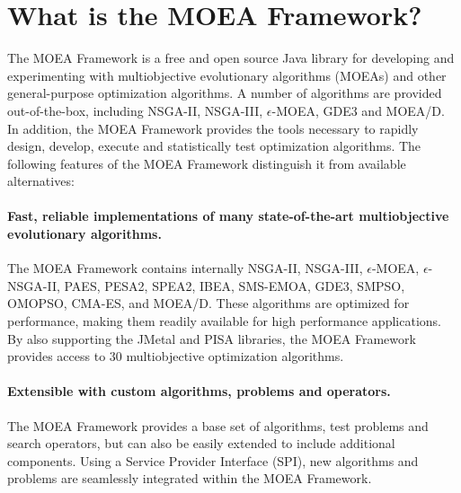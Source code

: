 %
%

\section{What is the MOEA Framework?}

The MOEA Framework is a free and open source Java library for developing and experimenting with multiobjective evolutionary algorithms (MOEAs) and other general-purpose optimization algorithms.  A number of algorithms are provided out-of-the-box, including NSGA-II, NSGA-III, $\epsilon$-MOEA, GDE3 and MOEA/D.  In addition, the MOEA Framework provides the tools necessary to rapidly design, develop, execute and statistically test optimization algorithms.  The following features of the MOEA Framework distinguish it from available alternatives:

\paragraph{Fast, reliable implementations of many state-of-the-art multiobjective evolutionary algorithms.}  The MOEA Framework contains internally NSGA-II, NSGA-III, $\epsilon$-MOEA, $\epsilon$-NSGA-II, PAES, PESA2, SPEA2, IBEA, SMS-EMOA, GDE3, SMPSO, OMOPSO, CMA-ES, and MOEA/D.  These algorithms are optimized for performance, making them readily available for high performance applications.  By also supporting the JMetal and PISA libraries, the MOEA Framework provides access to $30$ multiobjective optimization algorithms.

\paragraph{Extensible with custom algorithms, problems and operators.}  The MOEA Framework provides a base set of algorithms, test problems and search operators, but can also be easily extended to include additional components.  Using a Service Provider Interface (SPI), new algorithms and problems are seamlessly integrated within the MOEA Framework.  

